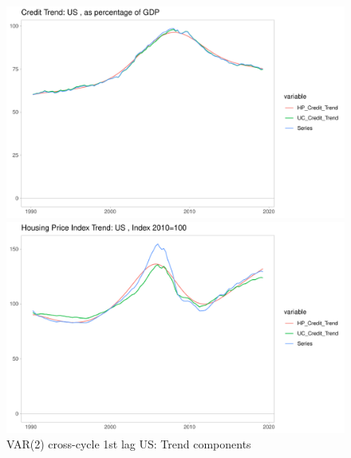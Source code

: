 \documentclass[fleqn]{article}
\begin{document}
\begin{outline}[enumerate]
		\begin{figure}[h!]
			\caption{VAR(2) cross-cycle 1st lag US: Trend components}	
			\centerline{\includegraphics[scale=0.7]{../../Regression/VAR_2_crosscycle_1stlagonly/Output/Graphs/Credit_trend_US.pdf}}
			\centerline{\includegraphics[scale=0.7]{../../Regression/VAR_2_crosscycle_1stlagonly/Output/Graphs/HP_trend_US.pdf}}
		\end{figure}
		

\end{outline}
\end{document}
